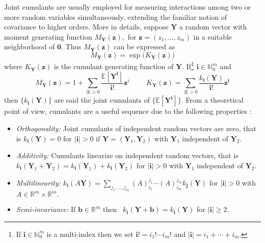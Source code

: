 Joint cumulants are usually employed for measuring interactions among
two or more random variables simultaneously, extending the familiar
notion of covariance to higher orders. More in details, suppose
\(\boldsymbol{Y}\) a random vector with moment generating function
\(M_{\boldsymbol{Y}}(\boldsymbol{z}),\) for
\(\boldsymbol{z}=(z_1, \ldots, z_m)\) in a suitable neighborhood of
\(\boldsymbol{0}.\) Thus \(M_{\boldsymbol{Y}}(\boldsymbol{z})\) can be
expressed as \begin{equation}
M_{\boldsymbol{Y}}(\boldsymbol{z}) = \exp\big(K_{\boldsymbol{Y}}(\boldsymbol{z}) \big) 
\label{(1bis)}
\end{equation} where \(K_{\boldsymbol{Y}}(\boldsymbol{z})\) is the
cumulant generating function of \(\boldsymbol{Y}.\) If\footnote{If
  \(\boldsymbol{i}\in {\mathbb N}_0^m\) is a multi-index then we set
  \(\boldsymbol{i}! = i_1! \cdots i_m!\) and
  \(|\boldsymbol{i}|=i_1 + \cdots + i_m.\)}
\(\boldsymbol{i}\in {\mathbb N}_0^m\) and \begin{equation}
M_{\boldsymbol{Y}}(\boldsymbol{z})=1 + \sum_{|\boldsymbol{i}| > 0} \frac{{\mathbb E}[\boldsymbol{Y}^{\boldsymbol{i}}]}{\boldsymbol{i}!} \boldsymbol{z}^i \, \qquad \, K_{\boldsymbol{Y}}(\boldsymbol{z}) = \sum_{|\boldsymbol{i}| > 0} \frac{k_{\boldsymbol{i}}(\boldsymbol{Y})}{\boldsymbol{i}!} \boldsymbol{z}^{\boldsymbol{i}}
\label{(2)}
\end{equation} then \(\{k_{\boldsymbol{i}}(\boldsymbol{Y})\}\) are said
the joint cumulants of
\(\{{\mathbb E}[\boldsymbol{Y}^{\boldsymbol{i}}]\}.\) From a theoretical
point of view, cumulants are a useful sequence due to the following
properties \citep{MR3437172}:

\begin{itemize}
\item
  \emph{Orthogonality:} Joint cumulants of independent random vectors
  are zero, that is \(k_{\boldsymbol{i}}(\boldsymbol{Y}) = 0\) for
  \(|\boldsymbol{i}| > 0\) if
  \(\boldsymbol{Y} = (\boldsymbol{Y}_1, \boldsymbol{Y}_2)\) with
  \(\boldsymbol{Y}_1\) independent of \(\boldsymbol{Y}_2.\)
\item
  \emph{Additivity:} Cumulants linearize on independent random vectors,
  that is\\
  \(k_{\boldsymbol{i}}(\boldsymbol{Y}_1 + \boldsymbol{Y}_2) =k_{\boldsymbol{i}}(\boldsymbol{Y}_1) + k_{\boldsymbol{i}}(\boldsymbol{Y}_2)\)
  for \(|\boldsymbol{i}|> 0\) with \(\boldsymbol{Y}_1\) independent of
  \(\boldsymbol{Y}_2.\)
\item
  \emph{Multilinearity:}
  \(k_{\boldsymbol{i}}(A \boldsymbol{Y}) = \sum_{j_1, \ldots, j_m} (A)_{\scriptscriptstyle{i_1}}^{\scriptscriptstyle{j_1}} \cdots (A)_{\scriptscriptstyle{i_m}}^{\scriptscriptstyle{j_m}} k_{\boldsymbol{j}}(\boldsymbol{Y})\)
  for \(|\boldsymbol{i}|>0\) with
  \(A \in {\mathbb R}^m \times {\mathbb R}^m.\)
\item
  \emph{Semi-invariance:} If \(\boldsymbol{b} \in {\mathbb R}^m\) then~
  \(k_{\boldsymbol{i}}(\boldsymbol{Y} + \boldsymbol{b}) = k_{\boldsymbol{i}}(\boldsymbol{Y})\)
  for \(|\boldsymbol{i}| \geq 2\).
\end{itemize}

